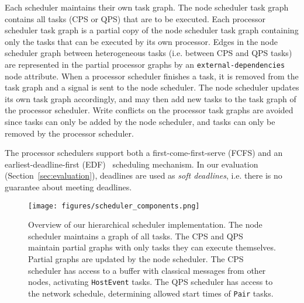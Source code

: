 Each scheduler maintains their own task graph.
The node scheduler task graph contains all tasks (CPS or QPS) that are to be executed.
Each processor scheduler task graph is a partial copy of the node scheduler task graph containing only the tasks that can be executed by its own processor.
Edges in the node scheduler graph between heterogeneous tasks (i.e. between CPS and QPS tasks) are represented in the partial processor graphs by an \texttt{external-dependencies} node attribute. 
When a processor scheduler finishes a task, it is removed from the task graph and a signal is sent to the node scheduler.
The node scheduler updates its own task graph accordingly, and may then add new tasks to the task graph of the processor scheduler.
Write conflicts on the processor task graphs are avoided since tasks can only be added by the node scheduler, and tasks can only be removed by the processor scheduler.

The processor schedulers support both a first-come-first-serve (FCFS) and an earliest-deadline-first (EDF)~\cite{silberschatz2006operating} scheduling mechanism.
In our evaluation (Section~\ref{sec:evaluation}), deadlines are used as \textit{soft deadlines}, i.e. there is no guarantee about meeting deadlines.

\begin{figure}%
    \centering
    \texttt{[image: figures/scheduler\_components.png]}
    \caption{Overview of our hierarchical scheduler implementation.
    The node scheduler maintains a graph of all tasks. The CPS and QPS maintain partial graphs with only tasks they can execute themselves. Partial graphs are updated by the node scheduler. 
    The CPS scheduler has access to a buffer with classical messages from other nodes, activating \texttt{HostEvent} tasks. The QPS scheduler has access to the network schedule, determining allowed start times of \texttt{Pair} tasks.}
    \label{fig:scheduler_impl}
\end{figure}




